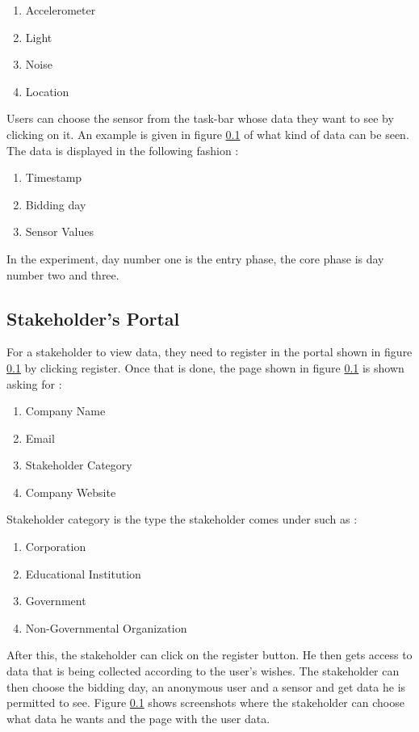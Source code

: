 \begin{enumerate}
    \item Accelerometer
    \item Light
    \item Noise
    \item Location
\end{enumerate}

Users can choose the sensor from the task-bar whose data they want to see by clicking on it. An example is given in figure \ref{} of what
kind of data can be seen. The data is displayed in the following fashion :

\begin{enumerate}
    \item Timestamp
    \item Bidding day
    \item Sensor Values
\end{enumerate}

In the experiment, day number one is the entry phase, the core phase is day number two and three.

\subsection{Stakeholder's Portal}

For a stakeholder to view data, they need to register in the portal shown in figure \ref{} by clicking register. Once that is done,
the page shown in figure \ref{} is shown asking for :

\begin{enumerate}
    \item Company Name
    \item Email
    \item Stakeholder Category
    \item Company Website
\end{enumerate}

Stakeholder category is the type the stakeholder comes under such as :

\begin{enumerate}
    \item Corporation
    \item Educational Institution
    \item Government
    \item Non-Governmental Organization
\end{enumerate}

After this, the stakeholder can click on the register button. He then gets access to data that is being collected according to the user's wishes.
The stakeholder can then choose the bidding day, an anonymous user and a sensor and get data he is permitted to see. Figure \ref{} shows screenshots 
where the stakeholder can choose what data he wants and the page with the user data. 





